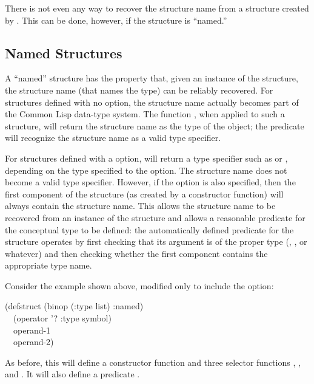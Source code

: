 There is not even any way to recover the structure name  from
a structure created by .  This can be done, however,
if the structure is ``named.''

\subsection{Named Structures}

A ``named'' structure has the property that, given an instance of the
structure, the structure name (that names the type) can be reliably
recovered.  For structures defined
with no  option, the structure name actually becomes part
of the Common Lisp data-type system.  The function ,
when applied to such a structure, will return the structure name
as the type of the object; the predicate  will recognize
the structure name as a valid type specifier.

For structures defined with a  option,  will
return a type specifier such as  or ,
depending on the type specified to the  option.
The structure name does not become a valid type specifier.
However,
if the  option is also specified, then the first component
of the structure (as created by a  constructor function)
will always contain the structure name.  This allows the structure name
to be recovered from an instance of the structure and allows a reasonable
predicate for the conceptual type to be defined:
the automatically defined
 predicate for the structure operates by first
checking that its argument is of the proper type (, ,
or whatever) and then checking whether the first component contains
the appropriate type name.

Consider the  example shown above, modified only to
include the  option:
\begin{lisp}
(defstruct (binop (:type list) :named) \\
~~(operator '? :type symbol) \\
~~operand-1 \\
~~operand-2)
\end{lisp}
As before, this will define a constructor function  and three
selector functions , ,
and .  It will also define a predicate .

